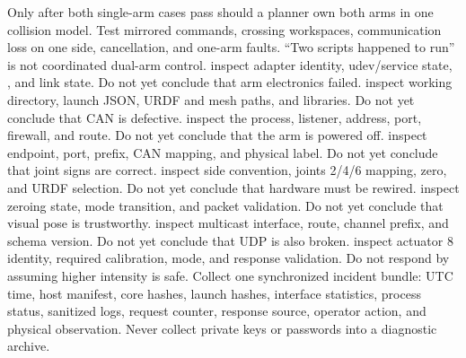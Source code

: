 {}
\markdownRendererSectionEnd \markdownRendererSectionBegin
{}\markdownRendererInterblockSeparator
{}Only after both single-arm cases pass should a planner own both arms in one collision model. Test mirrored commands, crossing workspaces, communication loss on one side, cancellation, and one-arm faults. “Two scripts happened to run” is not coordinated dual-arm control.\markdownRendererInterblockSeparator
{}
\markdownRendererSectionEnd 
\markdownRendererSectionEnd \markdownRendererSectionBegin
{}\markdownRendererInterblockSeparator
{}\markdownRendererUlBegin
\markdownRendererUlItem {} inspect adapter identity, udev/service state, , and link state. Do not yet conclude that arm electronics failed.\markdownRendererUlItemEnd 
\markdownRendererUlItem {} inspect working directory, launch JSON, URDF and mesh paths, and libraries. Do not yet conclude that CAN is defective.\markdownRendererUlItemEnd 
\markdownRendererUlItem {} inspect the process, listener, address, port, firewall, and route. Do not yet conclude that the arm is powered off.\markdownRendererUlItemEnd 
\markdownRendererUlItem {} inspect endpoint, port, prefix, CAN mapping, and physical label. Do not yet conclude that joint signs are correct.\markdownRendererUlItemEnd 
\markdownRendererUlItem {} inspect side convention, joints 2/4/6 mapping, zero, and URDF selection. Do not yet conclude that hardware must be rewired.\markdownRendererUlItemEnd 
\markdownRendererUlItem {} inspect zeroing state, mode transition, and packet validation. Do not yet conclude that visual pose is trustworthy.\markdownRendererUlItemEnd 
\markdownRendererUlItem {} inspect multicast interface, route, channel prefix, and schema version. Do not yet conclude that UDP is also broken.\markdownRendererUlItemEnd 
\markdownRendererUlItem {} inspect actuator 8 identity, required calibration, mode, and response validation. Do not respond by assuming higher intensity is safe.\markdownRendererUlItemEnd 
\markdownRendererUlEnd \markdownRendererInterblockSeparator
{}Collect one synchronized incident bundle: UTC time, host manifest, core hashes, launch hashes, interface statistics, process status, sanitized logs, request counter, response source, operator action, and physical observation. Never collect private keys or passwords into a diagnostic archive.\markdownRendererInterblockSeparator
